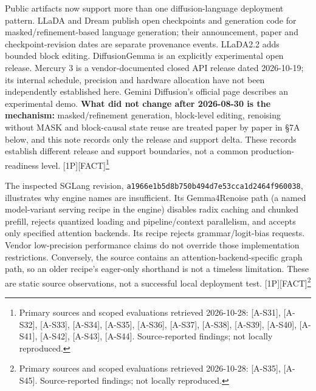 Public artifacts now support more than one diffusion-language deployment
pattern. LLaDA and Dream publish open checkpoints and generation code
for masked/refinement-based language generation; their announcement,
paper and checkpoint-revision dates are separate provenance events.
LLaDA2.2 adds bounded block editing. DiffusionGemma is an explicitly
experimental open release. Mercury 3 is a vendor-documented closed API
release dated 2026-10-19; its internal schedule, precision and hardware
allocation have not been independently established here. Gemini
Diffusion's official page describes an experimental demo. \textbf{What
did not change after 2026-08-30 is the mechanism:} masked/refinement
generation, block-level editing, renoising without MASK and block-causal
state reuse are treated paper by paper in §7A below, and this note
records only the release and support delta. These records establish
different release and support boundaries, not a common
production-readiness level. \mbox{{[}1P{]}}\hspace{0pt}\mbox{{[}FACT{]}}\footnote{Primary sources
  and scoped evaluations retrieved 2026-10-28: \mbox{{[}A-S31{]}}, \mbox{{[}A-S32{]}},
  \mbox{{[}A-S33{]}}, \mbox{{[}A-S34{]}}, \mbox{{[}A-S35{]}}, \mbox{{[}A-S36{]}}, \mbox{{[}A-S37{]}},
  \mbox{{[}A-S38{]}}, \mbox{{[}A-S39{]}}, \mbox{{[}A-S40{]}}, \mbox{{[}A-S41{]}}, \mbox{{[}A-S42{]}},
  \mbox{{[}A-S43{]}}, \mbox{{[}A-S44{]}}. Source-reported findings; not locally
  reproduced.}

The inspected SGLang revision,
\texttt{a1966e1b5d8b750b494d7e53cca1d2464f960038}, illustrates why
engine names are insufficient. Its Gemma4Renoise path (a named
model-variant serving recipe in the engine) disables radix caching and
chunked prefill, rejects quantized loading and pipeline/context
parallelism, and accepts only specified attention backends. Its recipe
rejects grammar/logit-bias requests. Vendor low-precision performance
claims do not override those implementation restrictions. Conversely,
the source contains an attention-backend-specific graph path, so an
older recipe's eager-only shorthand is not a timeless limitation. These
are static source observations, not a successful local deployment test.
\mbox{{[}1P{]}}\hspace{0pt}\mbox{{[}FACT{]}}\footnote{Primary sources and scoped evaluations
  retrieved 2026-10-28: \mbox{{[}A-S35{]}}, \mbox{{[}A-S45{]}}. Source-reported
  findings; not locally reproduced.}

